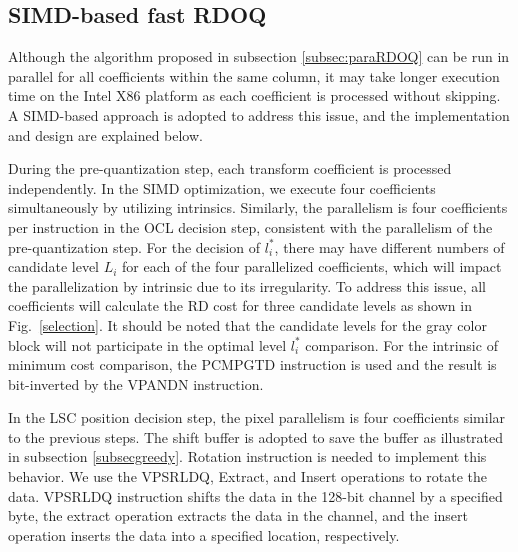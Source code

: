 \documentclass[lettersize,journal]{IEEEtran}
\begin{document}
\subsection{SIMD-based fast RDOQ} 
Although the algorithm proposed in subsection \ref{subsec:paraRDOQ} can be run in parallel for all coefficients within the same column, it may take longer execution time on the Intel X86 platform as each coefficient is processed without skipping. A SIMD-based approach is adopted to address this issue, and the implementation and design are explained below. 

During the pre-quantization step, each transform coefficient is processed independently. In the SIMD optimization, we execute four coefficients simultaneously by utilizing intrinsics. Similarly, the parallelism is four coefficients per instruction in the OCL decision step, consistent with the parallelism of the pre-quantization step. For the decision of $l_{i}^{*}$, there may have different numbers of candidate level $L_{i}$ for each of the four parallelized coefficients, which will impact the parallelization by intrinsic due to its irregularity. To address this issue, all coefficients will calculate the RD cost for three candidate levels as shown in Fig.~\ref{selection}. It should be noted that the candidate levels for the gray color block will not participate in the optimal level $l_{i}^{*}$ comparison. For the intrinsic of minimum cost comparison, the PCMPGTD instruction is used and the result is bit-inverted by the VPANDN instruction.
\par
In the LSC position decision step, the pixel parallelism is four coefficients similar to the previous steps. The shift buffer is adopted to save the buffer as illustrated in subsection \ref{subsecgreedy}. Rotation instruction is needed to implement this behavior. We use the VPSRLDQ, Extract, and Insert operations to rotate the data. VPSRLDQ instruction shifts the data in the 128-bit channel by a specified byte, the extract operation extracts the data in the channel, and the insert operation inserts the data into a specified location, respectively. 
\end{document}
